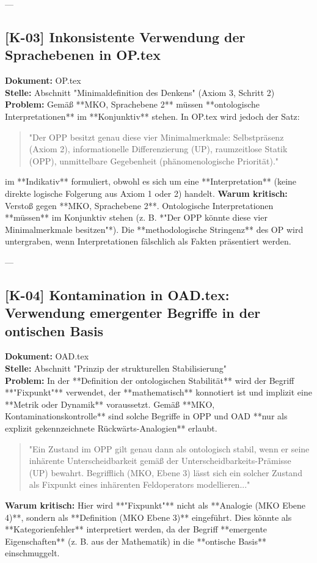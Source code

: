 \documentclass[11pt,a4paper]{article}
\begin{document}
---

\subsection*{[K-03] Inkonsistente Verwendung der Sprachebenen in OP.tex}
\textbf{Dokument:} OP.tex \\
\textbf{Stelle:} Abschnitt "Minimaldefinition des Denkens" (Axiom 3, Schritt 2) \\
\textbf{Problem:}
Gemäß **MKO, Sprachebene 2** müssen **ontologische Interpretationen** im **Konjunktiv** stehen. In OP.tex wird jedoch der Satz:
\begin{quote}
"Der OPP besitzt genau diese vier Minimalmerkmale: Selbstpräsenz (Axiom 2), informationelle Differenzierung (UP), raumzeitlose Statik (OPP), unmittelbare Gegebenheit (phänomenologische Priorität)."
\end{quote}
im **Indikativ** formuliert, obwohl es sich um eine **Interpretation** (keine direkte logische Folgerung aus Axiom 1 oder 2) handelt.
\textbf{Warum kritisch:}
Verstoß gegen **MKO, Sprachebene 2**. Ontologische Interpretationen **müssen** im Konjunktiv stehen (z. B. *"Der OPP könnte diese vier Minimalmerkmale besitzen"*). Die **methodologische Stringenz** des OP wird untergraben, wenn Interpretationen fälschlich als Fakten präsentiert werden.

---
\subsection*{[K-04] Kontamination in OAD.tex: Verwendung emergenter Begriffe in der ontischen Basis}
\textbf{Dokument:} OAD.tex \\
\textbf{Stelle:} Abschnitt "Prinzip der strukturellen Stabilisierung" \\
\textbf{Problem:}
In der **Definition der ontologischen Stabilität** wird der Begriff **"Fixpunkt"** verwendet, der **mathematisch** konnotiert ist und implizit eine **Metrik oder Dynamik** voraussetzt. Gemäß **MKO, Kontaminationskontrolle** sind solche Begriffe in OPP und OAD **nur als explizit gekennzeichnete Rückwärts-Analogien** erlaubt.
\begin{quote}
"Ein Zustand im OPP gilt genau dann als ontologisch stabil, wenn er seine inhärente Unterscheidbarkeit gemäß der Unterscheidbarkeits-Prämisse (UP) bewahrt. Begrifflich (MKO, Ebene 3) lässt sich ein solcher Zustand als Fixpunkt eines inhärenten Feldoperators modellieren..."
\end{quote}
\textbf{Warum kritisch:}
Hier wird **"Fixpunkt"** nicht als **Analogie (MKO Ebene 4)**, sondern als **Definition (MKO Ebene 3)** eingeführt. Dies könnte als **Kategorienfehler** interpretiert werden, da der Begriff **emergente Eigenschaften** (z. B. aus der Mathematik) in die **ontische Basis** einschmuggelt.
\end{document}
